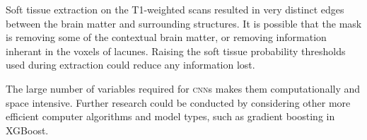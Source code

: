 Soft tissue extraction on the T1-weighted scans resulted in very distinct edges between the brain matter and surrounding structures. It is possible that the mask is removing some of the contextual brain matter, or removing information inherant in the voxels of lacunes. Raising the soft tissue probability thresholds used during extraction could reduce any information lost.

The large number of variables required for \textsc{cnn}s makes them computationally and space intensive. Further research could be conducted by considering other more efficient computer algorithms and model types, such as gradient boosting in XGBoost.

 

%
